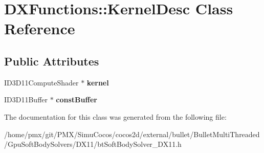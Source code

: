\hypertarget{classDXFunctions_1_1KernelDesc}{}\section{D\+X\+Functions\+:\+:Kernel\+Desc Class Reference}
\label{classDXFunctions_1_1KernelDesc}
\subsection*{Public Attributes}
\begin{DoxyCompactItemize}
\item 
\mbox{\label{classDXFunctions_1_1KernelDesc_ae3f8b2df209c97b69d03327ba69fad15}} 
I\+D3\+D11\+Compute\+Shader $\ast$ {\bfseries kernel}
\item 
\mbox{\label{classDXFunctions_1_1KernelDesc_a4802fe488d48091dd4141d9c0bbeebba}} 
I\+D3\+D11\+Buffer $\ast$ {\bfseries const\+Buffer}
\end{DoxyCompactItemize}


The documentation for this class was generated from the following file\+:\begin{DoxyCompactItemize}
\item 
/home/pmx/git/\+P\+M\+X/\+Simu\+Cocos/cocos2d/external/bullet/\+Bullet\+Multi\+Threaded/\+Gpu\+Soft\+Body\+Solvers/\+D\+X11/bt\+Soft\+Body\+Solver\+\_\+\+D\+X11.\+h\end{DoxyCompactItemize}
